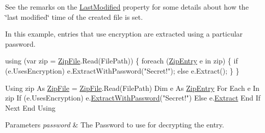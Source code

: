See the remarks on the \mbox{\hyperlink{class_super_tiled2_unity_1_1_ionic_1_1_zip_1_1_zip_entry_acd1234fd27c216b59c166c2b96aba3dd}{Last\+Modified}} property for some details about how the \char`\"{}last modified\char`\"{} time of the created file is set. 

In this example, entries that use encryption are extracted using a particular password. 
\begin{DoxyCode}
\textcolor{keyword}{using} (var zip = \mbox{\hyperlink{namespace_super_tiled2_unity_1_1_ionic_1_1_zip_a9ced5352c56e7e0fceff15b534073c83a088ad16b06174c69965e232063ba6d16}{ZipFile}}.Read(FilePath))
\{
    \textcolor{keywordflow}{foreach} (\mbox{\hyperlink{class_super_tiled2_unity_1_1_ionic_1_1_zip_1_1_zip_entry_a440b6d4d136b20dc6bdbdd399397e3a0}{ZipEntry}} e \textcolor{keywordflow}{in} zip)
    \{
        \textcolor{keywordflow}{if} (e.UsesEncryption)
            e.ExtractWithPassword(\textcolor{stringliteral}{"Secret!"});
        \textcolor{keywordflow}{else}
            e.Extract();
    \}
\}
\end{DoxyCode}
 
\begin{DoxyCode}
Using zip As \mbox{\hyperlink{namespace_super_tiled2_unity_1_1_ionic_1_1_zip_a9ced5352c56e7e0fceff15b534073c83a088ad16b06174c69965e232063ba6d16}{ZipFile}} = \mbox{\hyperlink{namespace_super_tiled2_unity_1_1_ionic_1_1_zip_a9ced5352c56e7e0fceff15b534073c83a088ad16b06174c69965e232063ba6d16}{ZipFile}}.Read(FilePath)
    Dim e As \mbox{\hyperlink{class_super_tiled2_unity_1_1_ionic_1_1_zip_1_1_zip_entry_a440b6d4d136b20dc6bdbdd399397e3a0}{ZipEntry}}
    For Each e In zip
        If (e.UsesEncryption)
          e.\mbox{\hyperlink{class_super_tiled2_unity_1_1_ionic_1_1_zip_1_1_zip_entry_a346d1d4eaf4ccb1274fe31629f3cb429}{ExtractWithPassword}}("Secret!")
        Else
          e.\mbox{\hyperlink{class_super_tiled2_unity_1_1_ionic_1_1_zip_1_1_zip_entry_a9d65543aadd23e47e188175412891b42}{Extract}}
        End If
    Next
End Using
\end{DoxyCode}
 


\begin{DoxyParams}{Parameters}
{\em password} & The Password to use for decrypting the entry.\\
\hline
\end{DoxyParams}
\mbox{\label{class_super_tiled2_unity_1_1_ionic_1_1_zip_1_1_zip_entry_a866b689638268d28d95bc075b350b4d9}} 
